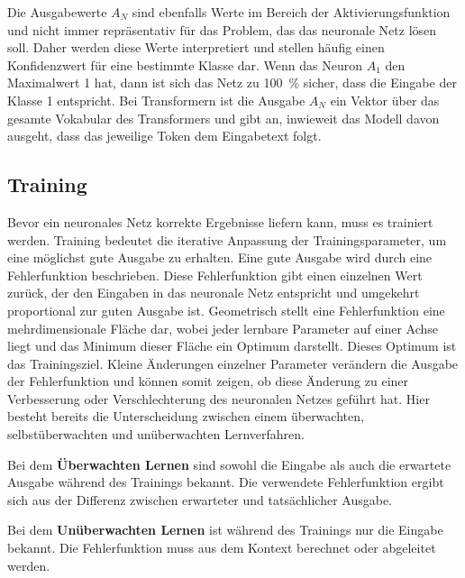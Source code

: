 Die Ausgabewerte $A_N$ sind ebenfalls Werte im Bereich der Aktivierungsfunktion und nicht immer repräsentativ für das Problem, das das neuronale Netz lösen soll.
Daher werden diese Werte interpretiert und stellen häufig einen Konfidenzwert für eine bestimmte Klasse dar.
Wenn das Neuron $A_1$ den Maximalwert 1 hat, dann ist sich das Netz zu \SI{100}{\percent} sicher, dass die Eingabe der Klasse 1 entspricht.
Bei Transformern ist die Ausgabe $A_N$ ein Vektor über das gesamte Vokabular des Transformers und gibt an, inwieweit das Modell davon ausgeht, dass das jeweilige Token dem Eingabetext folgt.\\

\subsection{Training}\label{subsec:grundlagen:training}
Bevor ein neuronales Netz korrekte Ergebnisse liefern kann, muss es trainiert werden.
Training bedeutet die iterative Anpassung der Trainingsparameter, um eine möglichst gute Ausgabe zu erhalten.
Eine gute Ausgabe wird durch eine Fehlerfunktion beschrieben.
Diese Fehlerfunktion gibt einen einzelnen Wert zurück, der den Eingaben in das neuronale Netz entspricht und umgekehrt proportional zur guten Ausgabe ist.
Geometrisch stellt eine Fehlerfunktion eine mehrdimensionale Fläche dar, wobei jeder lernbare Parameter auf einer Achse liegt und das Minimum dieser Fläche ein Optimum darstellt.
Dieses Optimum ist das Trainingsziel.
Kleine Änderungen einzelner Parameter verändern die Ausgabe der Fehlerfunktion und können somit zeigen, ob diese Änderung zu einer Verbesserung oder Verschlechterung des neuronalen Netzes geführt hat.
Hier besteht bereits die Unterscheidung zwischen einem überwachten, selbstüberwachten und unüberwachten Lernverfahren.\\

\begin{definition}\label{def:ueberwachtes-lernen}
    Bei dem \textbf{Überwachten Lernen} sind sowohl die Eingabe als auch die erwartete Ausgabe während des Trainings bekannt.
    Die verwendete Fehlerfunktion ergibt sich aus der Differenz zwischen erwarteter und tatsächlicher Ausgabe.
\end{definition}

\begin{definition}\label{def:unueberwachtes-lernen}
    Bei dem \textbf{Unüberwachten Lernen} ist während des Trainings nur die Eingabe bekannt.
    Die Fehlerfunktion muss aus dem Kontext berechnet oder abgeleitet werden.
\end{definition}

